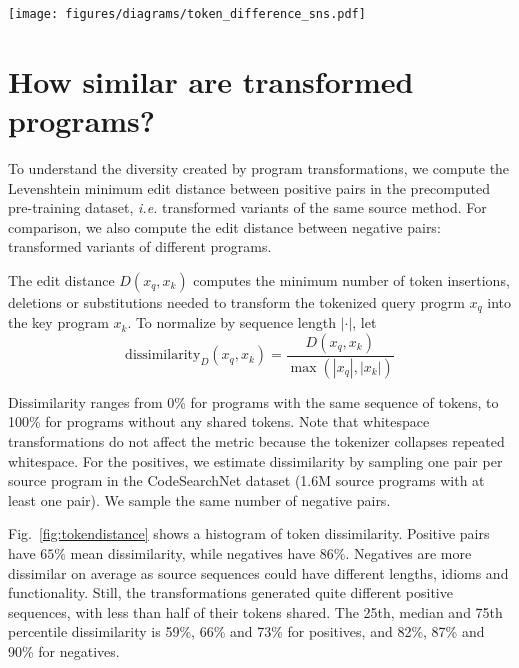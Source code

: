 \documentclass[11pt]{article}
\begin{document}
\begin{figure*}
  \centering
  \texttt{[image: figures/diagrams/token\_difference\_sns.pdf]}
  \caption{Histogram of pairwise token dissimilarity for contrastive positives (transformed variants of the same method) and negatives (transformed variants of different methods). Code transformations produce positives with dissimilar token sequences.}
  \label{fig:tokendistance}
\end{figure*}


 
\section{How similar are transformed programs?}
\label{sec:appendix:dissimilarity}
To understand the diversity created by program transformations, we compute the Levenshtein minimum edit distance between positive pairs in the precomputed pre-training dataset, \textit{i.e.} transformed variants of the same source method. For comparison, we also compute the edit distance between negative pairs: transformed variants of different programs.

The edit distance $D(x_q, x_k)$ computes the minimum number of token insertions, deletions or substitutions needed to transform the tokenized query progrm $x_q$ into the key program $x_k$.
 To normalize by sequence length $|\cdot|$, let \begin{equation}
    \text{dissimilarity}_{D}(x_q, x_k) = \frac{D(x_q, x_k)}{\max(|x_q|, |x_k|)}
    \label{eq:dissimilarity}
\end{equation}

Dissimilarity ranges from 0\% for programs with the same sequence of tokens, to 100\% for programs without any shared tokens.
Note that whitespace transformations do not affect the metric because the tokenizer collapses repeated whitespace. For the positives, we estimate dissimilarity by sampling one pair per source program in the CodeSearchNet dataset (1.6M source programs with at least one pair). We sample the same number of negative pairs.

Fig.~\ref{fig:tokendistance} shows a histogram of token dissimilarity. Positive pairs have $65\%$ mean dissimilarity, while negatives have $86\%$. Negatives are more dissimilar on average as source sequences could have different lengths, idioms and functionality. Still, the transformations generated quite different positive sequences, with less than half of their tokens shared. The 25th, median and 75th percentile dissimilarity is 59\%, 66\% and 73\% for positives, and 82\%, 87\% and 90\% for negatives.
\end{document}
